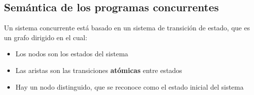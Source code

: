 \subsection{Semántica de los programas concurrentes}
Un sistema concurrente está basado en un sistema de transición de estado, que es un grafo dirigido en el cual:
\begin{itemize}
  \item Los nodos son los estados del sistema
  \item Las aristas son las transiciones \textbf{atómicas} entre estados
  \item Hay un nodo distinguido, que se reconoce como el estado inicial del sistema
\end{itemize}
